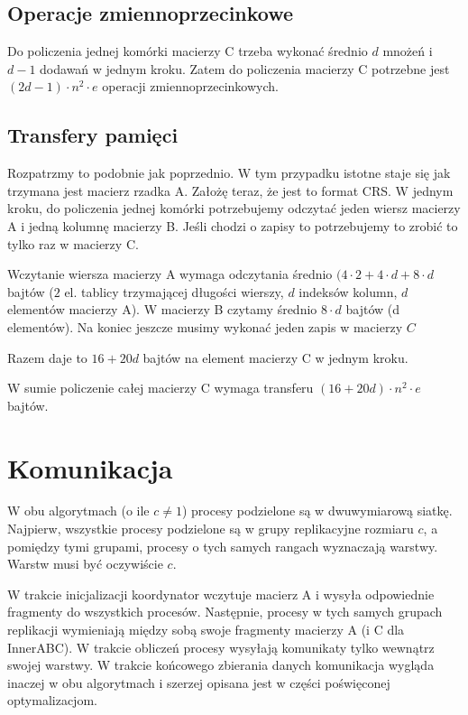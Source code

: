 \documentclass{article}
\begin{document}
\subsection{Operacje zmiennoprzecinkowe}
Do policzenia jednej komórki macierzy C trzeba wykonać średnio $d$ mnożeń i $d-1$ dodawań
w jednym kroku.
Zatem do policzenia macierzy C potrzebne jest $(2d-1) \cdot n^2 \cdot e$ operacji zmiennoprzecinkowych.

\subsection{Transfery pamięci}
Rozpatrzmy to podobnie jak poprzednio. W tym przypadku istotne staje się jak trzymana jest macierz rzadka A.
Założę teraz, że jest to format CRS.
W jednym kroku, do policzenia jednej komórki potrzebujemy odczytać jeden wiersz macierzy A i jedną kolumnę macierzy B.
Jeśli chodzi o zapisy to potrzebujemy to zrobić to tylko raz w macierzy C.

Wczytanie wiersza macierzy A wymaga odczytania średnio $(4 \cdot 2 + 4 \cdot d + 8 \cdot d$ bajtów ($2$ el. tablicy trzymającej długości wierszy,
$d$ indeksów kolumn, $d$ elementów macierzy A). W macierzy B czytamy średnio $8 \cdot d$ bajtów (d elementów).
Na koniec jeszcze musimy wykonać jeden zapis w macierzy $C$

Razem daje to $16 + 20d$ bajtów na element macierzy C w jednym kroku.

W sumie policzenie całej macierzy C wymaga transferu $(16 + 20d) \cdot n^2 \cdot e$ bajtów.


\section{Komunikacja}
W obu algorytmach (o ile $c \neq 1$) procesy podzielone są w dwuwymiarową siatkę. Najpierw, wszystkie procesy podzielone są w grupy
replikacyjne rozmiaru $c$, a pomiędzy tymi grupami, procesy o tych samych rangach wyznaczają warstwy. Warstw musi być oczywiście $c$.

W trakcie inicjalizacji koordynator wczytuje macierz A i wysyła odpowiednie fragmenty do wszystkich procesów.
Następnie, procesy w tych samych grupach replikacji wymieniają między sobą swoje fragmenty macierzy A (i C dla InnerABC).
W trakcie obliczeń procesy wysyłają komunikaty tylko wewnątrz swojej warstwy.
W trakcie końcowego zbierania danych komunikacja wygląda inaczej w obu algorytmach i szerzej opisana jest
w części poświęconej optymalizacjom.
\end{document}

